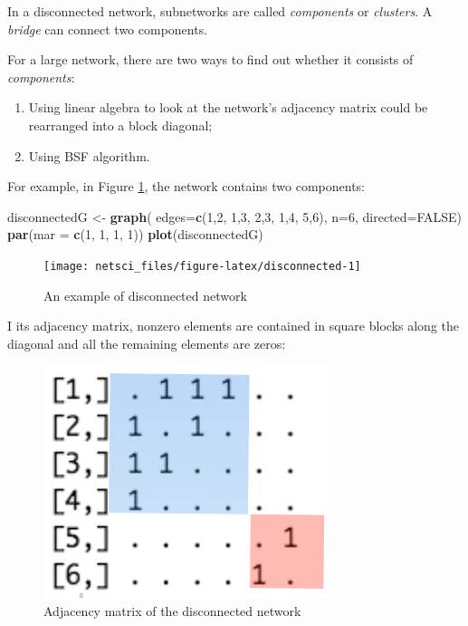 \documentclass[
]{krantz}
\makeatletter
\newenvironment{Shaded}{\begin{snugshade}}{\end{snugshade}}
\newcommand{\DataTypeTok}[1]{\textcolor[rgb]{0.27,0.27,0.27}{#1}}
\newcommand{\DecValTok}[1]{\textcolor[rgb]{0.06,0.06,0.06}{#1}}
\newcommand{\KeywordTok}[1]{\textcolor[rgb]{0.27,0.27,0.27}{\textbf{#1}}}
\newcommand{\NormalTok}[1]{#1}
\newcommand{\OtherTok}[1]{\textcolor[rgb]{0.37,0.37,0.37}{#1}}
\newcommand{\StringTok}[1]{\textcolor[rgb]{0.5,0.5,0.5}{#1}}
\newenvironment{kframe}{%
\medskip{}
\setlength{\fboxsep}{.8em}
 \def\at@end@of@kframe{}%
 \ifinner\ifhmode%
  \def\at@end@of@kframe{\end{minipage}}%
  \begin{minipage}{\columnwidth}%
 \fi\fi%
 \def\FrameCommand##1{\hskip\@totalleftmargin \hskip-\fboxsep
 \colorbox{shadecolor}{##1}\hskip-\fboxsep
     \hskip-\linewidth \hskip-\@totalleftmargin \hskip\columnwidth}%
 \MakeFramed {\advance\hsize-\width
   \@totalleftmargin\z@ \linewidth\hsize
   \@setminipage}}%
 {\par\unskip\endMakeFramed%
 \at@end@of@kframe}
\renewenvironment{Shaded}{\begin{kframe}}{\end{kframe}}
\makeatother
\begin{document}
In a disconnected network, subnetworks are called \emph{components} or \emph{clusters}. A \emph{bridge} can connect two components.

For a large network, there are two ways to find out whether it consists of \emph{components}:

\begin{enumerate}
\def\labelenumi{\arabic{enumi}.}
\item
  Using linear algebra to look at the network's adjacency matrix could be rearranged into a block diagonal;
\item
  Using BSF algorithm.
\end{enumerate}

For example, in Figure \ref{fig:disconnected}, the network contains two components:

\begin{Shaded}
\begin{Highlighting}[]
\NormalTok{disconnectedG <-}\StringTok{ }\KeywordTok{graph}\NormalTok{( }\DataTypeTok{edges=}\KeywordTok{c}\NormalTok{(}\DecValTok{1}\NormalTok{,}\DecValTok{2}\NormalTok{, }\DecValTok{1}\NormalTok{,}\DecValTok{3}\NormalTok{, }\DecValTok{2}\NormalTok{,}\DecValTok{3}\NormalTok{, }\DecValTok{1}\NormalTok{,}\DecValTok{4}\NormalTok{, }\DecValTok{5}\NormalTok{,}\DecValTok{6}\NormalTok{), }
                        \DataTypeTok{n=}\DecValTok{6}\NormalTok{, }
                        \DataTypeTok{directed=}\OtherTok{FALSE}\NormalTok{)}
\KeywordTok{par}\NormalTok{(}\DataTypeTok{mar =} \KeywordTok{c}\NormalTok{(}\DecValTok{1}\NormalTok{, }\DecValTok{1}\NormalTok{, }\DecValTok{1}\NormalTok{, }\DecValTok{1}\NormalTok{))}
\KeywordTok{plot}\NormalTok{(disconnectedG)}
\end{Highlighting}
\end{Shaded}

\begin{figure}

{\centering \texttt{[image: netsci\_files/figure-latex/disconnected-1]} 

}

\caption{An example of disconnected network}\label{fig:disconnected}
\end{figure}

I its adjacency matrix, nonzero elements are contained in square blocks along the diagonal and all the remaining elements are zeros:

\begin{figure}

{\centering \includegraphics[width=0.45\linewidth]{images/blockDiagonal} 

}

\caption{Adjacency matrix of the disconnected network}\label{fig:BDmatrix}
\end{figure}
\end{document}
